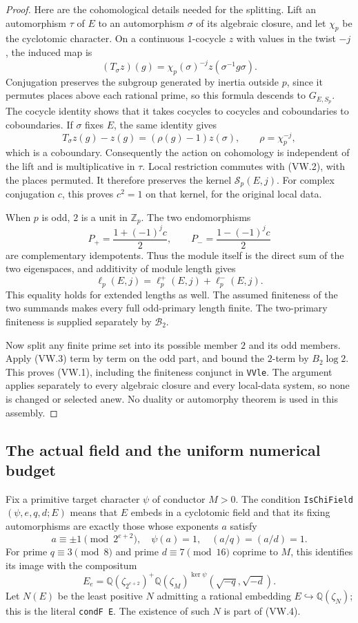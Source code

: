 \begin{proof}
Here are the cohomological details needed for the splitting.  Lift an
automorphism $\tau$ of $E$ to an automorphism $\sigma$ of its algebraic
closure, and let $\chi_p$ be the cyclotomic character.  On a continuous
$1$-cocycle $z$ with values in the twist $-j$, the induced map is
\[
 (T_\sigma z)(g)=\chi_p(\sigma)^{-j}z(\sigma^{-1}g\sigma).
 \tag{VW.2}
\]
Conjugation preserves the subgroup generated by inertia outside $p$,
since it permutes places above each rational prime, so this formula
descends to $G_{E,S_p}$.  The cocycle identity shows that it takes
cocycles to cocycles and coboundaries to coboundaries.  If $\sigma$ fixes
$E$, the same identity gives
\[
 T_\sigma z(g)-z(g)=(\rho(g)-1)z(\sigma),
 \qquad \rho=\chi_p^{-j},
\]
which is a coboundary.  Consequently the action on cohomology is
independent of the lift and is multiplicative in $\tau$.  Local
restriction commutes with (VW.2), with the places permuted.  It therefore
preserves the kernel $\mathscr S_p(E,j)$.  For complex conjugation $c$,
this proves $c^2=1$ on that kernel, for the original local data.

When $p$ is odd, $2$ is a unit in $\mathbb Z_p$.  The two endomorphisms
\[
 P_+=\frac{1+(-1)^jc}{2},\qquad
 P_-=\frac{1-(-1)^jc}{2}
\]
are complementary idempotents.  Thus the module itself is the direct
sum of the two eigenspaces, and additivity of module length gives
\[
                \ell_p(E,j)=\ell_p^+(E,j)+\ell_p^-(E,j).
                \tag{VW.3}
\]
This equality holds for extended lengths as well.  The assumed finiteness
of the two summands makes every full odd-primary length finite.
The two-primary finiteness is supplied separately by $\mathcal B_2$.

Now split any finite prime set into its possible member $2$ and its odd
members.  Apply (VW.3) term by term on the odd part, and bound the
$2$-term by $B_2\log2$.  This proves (VW.1), including the finiteness
conjunct in \texttt{VVle}.  The argument applies separately to every
algebraic closure and every local-data system, so none is changed or
selected anew.  No duality or automorphy theorem is used in this assembly.
\end{proof}

\subsection{The actual field and the uniform numerical budget}

Fix a primitive target character $\psi$ of conductor $M>0$.
The condition \texttt{IsChiField}$(\psi,e,q,d;E)$ means that $E$ embeds
in a cyclotomic field and that its fixing automorphisms are exactly those
whose exponents $a$ satisfy
\[
 a\equiv\pm1\pmod{2^{e+2}},\quad \psi(a)=1,\quad
 (a/q)=(a/d)=1.
 \tag{VW.4}
\]
For prime $q\equiv3\pmod8$ and prime $d\equiv7\pmod{16}$ coprime to
$M$, this identifies its image with the compositum
\[
 E_e=\mathbb Q(\zeta_{2^{e+2}})^+
          \mathbb Q(\zeta_M)^{\ker\psi}(\sqrt{-q},\sqrt{-d}).
 \tag{VW.5}
\]
Let $N(E)$ be the least positive $N$ admitting a rational embedding
$E\hookrightarrow\mathbb Q(\zeta_N)$; this is the literal
\texttt{condF E}.  The existence of such $N$ is part of (VW.4).

